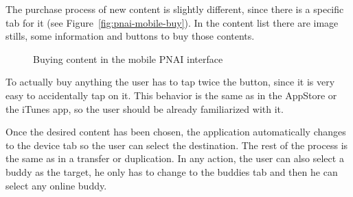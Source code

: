 The purchase process of new content is slightly different, since there is a specific tab for it (see Figure~\vref{fig:pnai-mobile-buy}).
In the content list there are image stills, some information and buttons to buy those contents.

\begin{figure}[htbp]
  \centering
  \caption{Buying content in the mobile PNAI interface}
  \label{fig:pnai-mobile-buy}
\end{figure}

To actually buy anything the user has to tap twice the button, since it is very easy to accidentally tap on it.
This behavior is the same as in the AppStore or the iTunes app, so the user should be already familiarized with it.

Once the desired content has been chosen, the application automatically changes to the device tab so the user can select the destination.
The rest of the process is the same as in a transfer or duplication.
In any action, the user can also select a buddy as the target, he only has to change to the buddies tab and then he can select any online buddy.
